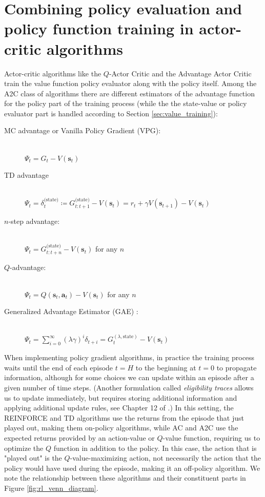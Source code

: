 \documentclass{article}
\begin{document}
\section{Combining policy evaluation and policy function training in actor-critic algorithms}
Actor-critic algorithms like the $Q$-Actor Critic and the Advantage Actor Critic train the value function policy evaluator along with the policy itself. Among the A2C class of algorithms there are different estimators of the advantage function for the policy part of the training process (while the the state-value or policy evaluator part is handled according to Section \ref{sec:value_training}):
\begin{description}
\item[MC advantage or Vanilla Policy Gradient (VPG):]\hfill \\
$\Psi_t =G_t-V(\mathbf{s}_t)$
\item[TD advantage]\hfill \\
$\Psi_t =\delta_t^\text{(state)}\coloneqq G_{t:t+1}^\text{(state)}-V(\mathbf{s}_t)= r_t+\gamma V(\mathbf{s}_{t+1})-V(\mathbf{s}_t)$
\item[$n$-step advantage:]\hfill \\
$\Psi_t =G_{t:t+n}^\text{(state)}-V(\mathbf{s}_t)$ for any $n$
\item[$Q$-advantage:]\hfill \\
$\Psi_t =Q(\mathbf{s}_t,\mathbf{a}_t)-V(\mathbf{s}_t)$ for any $n$
\item[Generalized Advantage Estimator (GAE) :]\hfill \\ 
$\Psi_t=\sum_{i=0}^\infty(\lambda\gamma)^i\delta_{t+i}=G^{(\lambda,\text{state})}_t-V(\mathbf{s}_{t})$
\end{description}

When implementing policy gradient algorithms, in practice the training process waits until the end of each episode $t=H$ to the beginning at $t=0$ to propagate information, although for some choices we can update within an episode after a given number of time steps. (Another formulation called \textit{eligibility traces} allows us to update immediately, but requires storing additional information and applying additional update rules, see Chapter 12 of \cite{sutton_barto_rl}.) In this setting, the REINFORCE and TD algorithms use the returns from the episode that just played out, making them on-policy algorithms, while AC and A2C use the expected returns provided by an action-value or $Q$-value function, requiring us to optimize the $Q$ function in addition to the policy. In this case, the action that is "played out" is the $Q$-value-maximizing action, not necessarily the action that the policy would have used during the episode, making it an off-policy algorithm.  We note the relationship between these algorithms and their constituent parts in Figure \ref{fig:rl_venn_diagram}.
\end{document}
